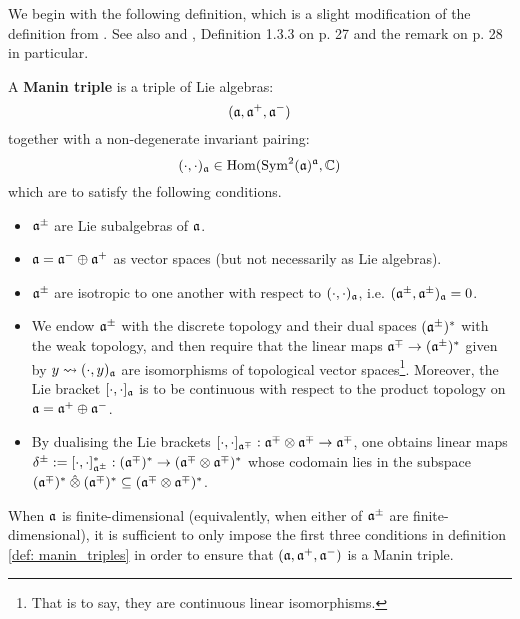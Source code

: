 We begin with the following definition, which is a slight modification of the definition from \cite[Subsection 2.6]{appel_laredo_2_categorical_etingof_kazhdan_quantisation}. See also \cite[Subsection 7.4]{etingof_kazhdan_quantisation_1} and \cite[Subsection 1.3.B]{chari_pressley_quantum_groups}, Definition 1.3.3 on p. 27 and the remark on p. 28 in particular.
\begin{definition} \label{def: manin_triples}
    A \textbf{Manin triple} is a triple of Lie algebras:
        $$(\mathfrak{a}, \mathfrak{a}^+, \mathfrak{a}^-)$$
    together with a non-degenerate invariant pairing:
        $$(\cdot, \cdot)_{\mathfrak{a}} \in \operatorname{Hom}( \operatorname{Sym}^2(\mathfrak{a})^{\mathfrak{a}}, \mathbb{C} )$$
    which are to satisfy the following conditions.
    \begin{itemize}
        \item $\mathfrak{a}^{\pm}$ are Lie subalgebras of $\mathfrak{a}$.
        \item $\mathfrak{a} = \mathfrak{a}^- \oplus \mathfrak{a}^+$ as vector spaces (but not necessarily as Lie algebras).
        \item $\mathfrak{a}^{\pm}$ are isotropic to one another with respect to $(\cdot, \cdot)_{\mathfrak{a}}$, i.e. $(\mathfrak{a}^{\pm}, \mathfrak{a}^{\pm})_{\mathfrak{a}} = 0$.
        \item We endow $\mathfrak{a}^{\pm}$ with the discrete topology and their dual spaces $(\mathfrak{a}^{\pm})^*$ with the weak topology, and then require that the linear maps $\mathfrak{a}^{\mp} \to (\mathfrak{a}^{\pm})^*$ given by $y \leadsto (\cdot, y)_{\mathfrak{a}}$ are isomorphisms of topological vector spaces\footnote{That is to say, they are continuous linear isomorphisms.}. Moreover, the Lie bracket $[\cdot, \cdot]_{\mathfrak{a}}$ is to be continuous with respect to the product topology on $\mathfrak{a} = \mathfrak{a}^+ \oplus \mathfrak{a}^-$.
        \item By dualising the Lie brackets $[\cdot, \cdot]_{\a^{\mp}}: \a^{\mp} \tensor \a^{\mp} \to \a^{\mp}$, one obtains linear maps $\delta^{\pm} := [\cdot, \cdot]_{\a^{\pm}}^*: (\a^{\mp})^* \to (\a^{\mp} \tensor \a^{\mp})^*$ whose codomain lies in the subspace $(\a^{\mp})^* \hattensor (\a^{\mp})^* \subseteq (\a^{\mp} \tensor \a^{\mp})^*$.
    \end{itemize}
\end{definition}
\begin{remark}
    When $\mathfrak{a}$ is finite-dimensional (equivalently, when either of $\mathfrak{a}^{\pm}$ are finite-dimensional), it is sufficient to only impose the first three conditions in definition \ref{def: manin_triples} in order to ensure that $(\mathfrak{a}, \mathfrak{a}^+, \mathfrak{a}^-)$ is a Manin triple.
\end{remark}

